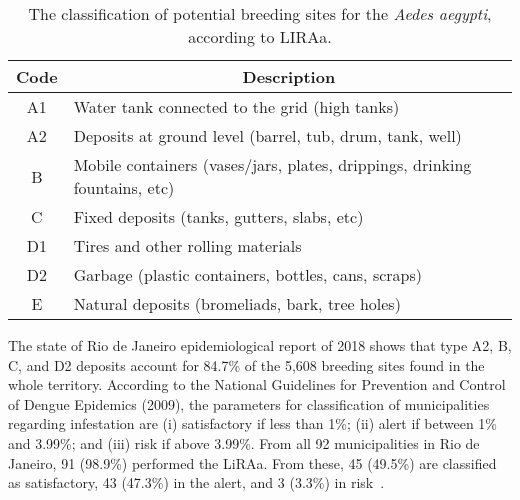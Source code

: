 \begin{table}[b!]
\caption{The classification of potential breeding sites for the {\it Aedes aegypti}, according to LIRAa.}
\label{tab:deposits}
\begin{tabular}{cl}
\toprule
\textbf{Code} & \multicolumn{1}{c}{\textbf{Description}}\\ \hline
A1 & Water tank connected to the grid (high tanks)\\
A2 & Deposits at ground level (barrel, tub, drum, tank, well) \\
B  & Mobile containers (vases/jars, plates, drippings, drinking fountains, etc) \\
C  & Fixed deposits (tanks, gutters, slabs, etc) \\
D1 & Tires and other rolling materials \\
D2 & Garbage (plastic containers, bottles, cans, scraps) \\
E  & Natural deposits (bromeliads, bark, tree holes) \\ \bottomrule
\end{tabular}
\end{table}



The state of Rio de Janeiro epidemiological report of 2018 shows that type A2, B, C, and D2 deposits account for 84.7\% of the 5,608 breeding sites found in the whole territory.
According to the National Guidelines for Prevention and Control of Dengue Epidemics (2009), the parameters for classification of municipalities regarding \Aedes infestation are (i) satisfactory if less than 1\%; (ii) alert if between 1\% and 3.99\%; and (iii) risk if above 3.99\%.
From all 92 municipalities in Rio de Janeiro, 91 (98.9\%) performed the LiRAa.
From these, 45 (49.5\%) are classified as satisfactory, 43 (47.3\%) in the alert, and 3 (3.3\%) in risk~\cite{rj2018epid52018}.


